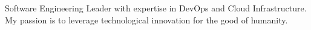 

\begin{cvparagraph}

\center
{
  Software Engineering Leader with expertise in DevOps and Cloud Infrastructure.\linebreak
  My passion is to leverage technological innovation for the good of humanity.
}
\end{cvparagraph}
